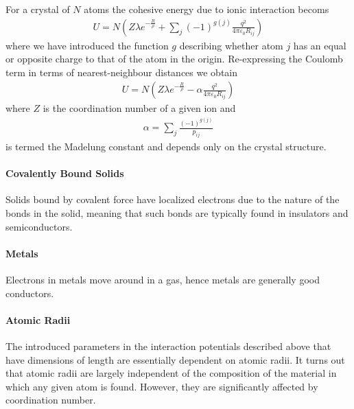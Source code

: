 For a crystal of $N$ atoms the cohesive energy due to ionic interaction becoms
\begin{align*}
	U = N\left(Z\lambda e^{-\frac{R}{\rho}} + \sum\limits_{j}(-1)^{g(j)}\frac{q^{2}}{4\pi\varepsilon_{0}R_{ij}}\right)
\end{align*}
where we have introduced the function $g$ describing whether atom  $j$ has an equal or opposite charge to that of the atom in the origin. Re-expressing the Coulomb term in terms of nearest-neighbour distances we obtain
\begin{align*}
	U = N\left(Z\lambda e^{-\frac{R}{\rho}} - \alpha\frac{q^{2}}{4\pi\varepsilon_{0}R_{ij}}\right)
\end{align*}
where $Z$ is the coordination number of a given ion and
\begin{align*}
	\alpha = \sum\limits_{j}\frac{(-1)^{g(j)}}{p_{ij}}
\end{align*}
is termed the Madelung constant and depends only on the crystal structure.

\paragraph{Covalently Bound Solids}
Solids bound by covalent force have localized electrons due to the nature of the bonds in the solid, meaning that such bonds are typically found in insulators and semiconductors.

\paragraph{Metals}
Electrons in metals move around in a gas, hence metals are generally good conductors.

\paragraph{Atomic Radii}
The introduced parameters in the interaction potentials described above that have dimensions of length are essentially dependent on atomic radii. It turns out that atomic radii are largely independent of the composition of the material in which any given atom is found. However, they are significantly affected by coordination number.
